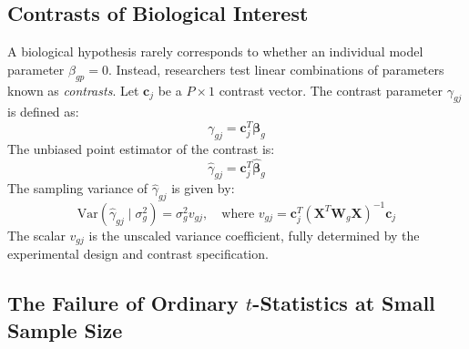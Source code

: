 \documentclass[11pt,twoside,openright]{book}
\begin{document}
\subsection{Contrasts of Biological Interest}

A biological hypothesis rarely corresponds to whether an individual model parameter $\beta_{gp} = 0$. Instead, researchers test linear combinations of parameters known as \textit{contrasts}. Let $\mathbf{c}_j$ be a $P \times 1$ contrast vector. The contrast parameter $\gamma_{gj}$ is defined as:
\begin{equation}
\gamma_{gj} = \mathbf{c}_j^T \boldsymbol{\beta}_g
\end{equation}
The unbiased point estimator of the contrast is:
\begin{equation}
\hat{\gamma}_{gj} = \mathbf{c}_j^T \hat{\boldsymbol{\beta}}_g
\end{equation}
The sampling variance of $\hat{\gamma}_{gj}$ is given by:
\begin{equation}
\text{Var}(\hat{\gamma}_{gj} \mid \sigma_g^2) = \sigma_g^2 v_{gj}, \quad \text{where } v_{gj} = \mathbf{c}_j^T (\mathbf{X}^T \mathbf{W}_g \mathbf{X})^{-1} \mathbf{c}_j
\label{eq:contrast_variance}
\end{equation}
The scalar $v_{gj}$ is the unscaled variance coefficient, fully determined by the experimental design and contrast specification.

\subsection{The Failure of Ordinary \texorpdfstring{$t$}{t}-Statistics at Small Sample Size}
\end{document}

